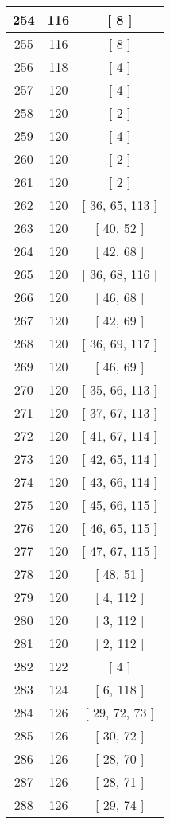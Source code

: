 \begin{center}
\begin{longtable}[H]{|| c c c ||}
\hline
254 & 116 & [ 8 ] \\ 
\hline
255 & 116 & [ 8 ] \\ 
\hline
256 & 118 & [ 4 ] \\ 
\hline
257 & 120 & [ 4 ] \\ 
\hline
258 & 120 & [ 2 ] \\ 
\hline
259 & 120 & [ 4 ] \\ 
\hline
260 & 120 & [ 2 ] \\ 
\hline
261 & 120 & [ 2 ] \\ 
\hline
262 & 120 & [ 36, 65, 113 ] \\ 
\hline
263 & 120 & [ 40, 52 ] \\ 
\hline
264 & 120 & [ 42, 68 ] \\ 
\hline
265 & 120 & [ 36, 68, 116 ] \\ 
\hline
266 & 120 & [ 46, 68 ] \\ 
\hline
267 & 120 & [ 42, 69 ] \\ 
\hline
268 & 120 & [ 36, 69, 117 ] \\ 
\hline
269 & 120 & [ 46, 69 ] \\ 
\hline
270 & 120 & [ 35, 66, 113 ] \\ 
\hline
271 & 120 & [ 37, 67, 113 ] \\ 
\hline
272 & 120 & [ 41, 67, 114 ] \\ 
\hline
273 & 120 & [ 42, 65, 114 ] \\ 
\hline
274 & 120 & [ 43, 66, 114 ] \\ 
\hline
275 & 120 & [ 45, 66, 115 ] \\ 
\hline
276 & 120 & [ 46, 65, 115 ] \\ 
\hline
277 & 120 & [ 47, 67, 115 ] \\ 
\hline
278 & 120 & [ 48, 51 ] \\ 
\hline
279 & 120 & [ 4, 112 ] \\ 
\hline
280 & 120 & [ 3, 112 ] \\ 
\hline
281 & 120 & [ 2, 112 ] \\ 
\hline
282 & 122 & [ 4 ] \\ 
\hline
283 & 124 & [ 6, 118 ] \\ 
\hline
284 & 126 & [ 29, 72, 73 ] \\ 
\hline
285 & 126 & [ 30, 72 ] \\ 
\hline
286 & 126 & [ 28, 70 ] \\ 
\hline
287 & 126 & [ 28, 71 ] \\ 
\hline
288 & 126 & [ 29, 74 ] \\ 

\end{longtable}
\end{center}
